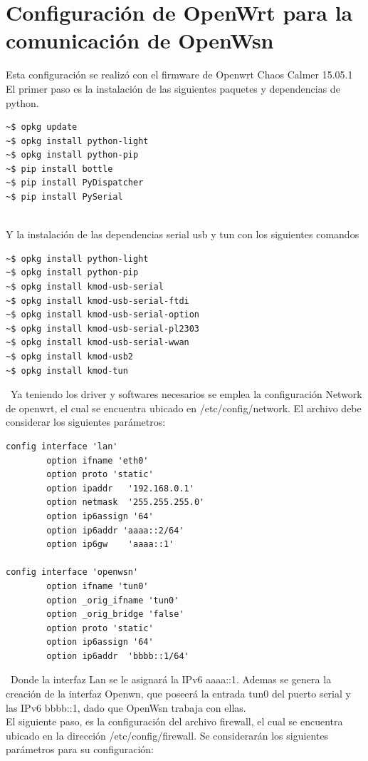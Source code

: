 \documentclass[journal]{IEEEtran}
\begin{document}
\section{Configuración de OpenWrt para la comunicación de OpenWsn}  
 Esta configuración se realizó con el firmware de Openwrt Chaos Calmer 15.05.1
 \\
  
 El primer paso es la instalación de las siguientes paquetes y dependencias de python.
 \begin{lstlisting}[frame=single]
~$ opkg update
~$ opkg install python-light
~$ opkg install python-pip
~$ pip install bottle
~$ pip install PyDispatcher
~$ pip install PySerial
\end{lstlisting}
\ \\
Y la instalación de las dependencias serial usb y tun con los siguientes comandos
 \begin{lstlisting}[frame=single]
~$ opkg install python-light
~$ opkg install python-pip
~$ opkg install kmod-usb-serial
~$ opkg install kmod-usb-serial-ftdi
~$ opkg install kmod-usb-serial-option
~$ opkg install kmod-usb-serial-pl2303
~$ opkg install kmod-usb-serial-wwan
~$ opkg install kmod-usb2
~$ opkg install kmod-tun
\end{lstlisting}
\
Ya teniendo los driver y softwares necesarios se emplea la configuración Network de openwrt, el cual se encuentra ubicado en /etc/config/network. 
\newpage 
El archivo debe considerar los siguientes parámetros:
 \begin{lstlisting}[frame=single]
config interface 'lan'
        option ifname 'eth0'
        option proto 'static'
        option ipaddr   '192.168.0.1'   
        option netmask  '255.255.255.0'
        option ip6assign '64'
        option ip6addr 'aaaa::2/64'
        option ip6gw    'aaaa::1'
        
config interface 'openwsn'
        option ifname 'tun0'
        option _orig_ifname 'tun0'
        option _orig_bridge 'false'
        option proto 'static'
        option ip6assign '64'
        option ip6addr  'bbbb::1/64'
\end{lstlisting}
\
Donde la interfaz Lan se le asignará la IPv6 aaaa::1. Ademas se genera la creación de la interfaz Openwn, que poseerá la entrada tun0 del puerto serial y las IPv6 bbbb::1, dado que OpenWsn trabaja con ellas.
\ \\
El siguiente paso, es la configuración del archivo firewall, el cual se encuentra ubicado en la dirección /etc/config/firewall. Se considerarán los siguientes parámetros para su configuración:
\end{document}
